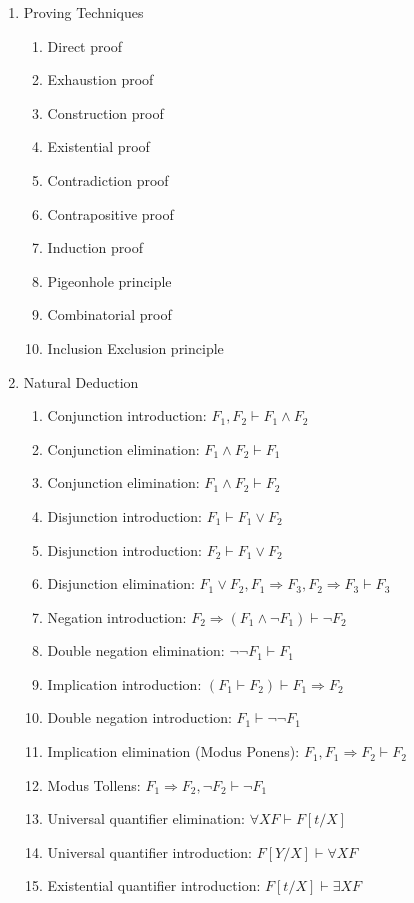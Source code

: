 \documentclass[11pt, twocolumn]{article}
\theoremstyle{definition} \newtheorem*{solution}{Solution}
\begin{document}
\begin{enumerate}
\item Proving Techniques
\begin{enumerate}
\item Direct proof
\item Exhaustion proof
\item Construction proof
\item Existential proof
\item Contradiction proof
\item Contrapositive proof
\item Induction proof
\item Pigeonhole principle
\item Combinatorial proof
\item Inclusion Exclusion principle
\end{enumerate}
\item Natural Deduction
\begin{enumerate}
\item Conjunction introduction: $F_1, F_2 \vdash F_1 \wedge F_2$
\item Conjunction elimination: $F_1 \wedge F_2 \vdash F_1$
\item Conjunction elimination: $F_1 \wedge F_2 \vdash F_2$
\item Disjunction introduction: $F_1 \vdash F_1\vee F_2$
\item Disjunction introduction: $F_2 \vdash F_1\vee F_2$
\item Disjunction elimination: $F_1 \vee F_2, F_1\Rightarrow F_3, F_2\Rightarrow F_3 \vdash F_3$
\item Negation introduction: $F_2 \Rightarrow (F_1 \wedge \neg F_1) \vdash \neg F_2$
\item Double negation elimination: $\neg \neg F_1 \vdash F_1$
\item Implication introduction: $(F_1 \vdash F_2)\vdash F_1\Rightarrow F_2$
\item Double negation introduction: $F_1 \vdash \neg\neg F_1$
\item Implication elimination (Modus Ponens): $F_1, F_1 \Rightarrow F_2 \vdash F_2$
\item Modus Tollens: $F_1\Rightarrow F_2, \neg F_2 \vdash \neg F_1$
\item Universal quantifier elimination: $\forall X F \vdash F[t/X]$
\item Universal quantifier introduction: $F[Y/X] \vdash \forall X F$
\item Existential quantifier introduction: $F[t/X] \vdash \exists X F$

\end{enumerate}
\end{enumerate}
\end{document}
